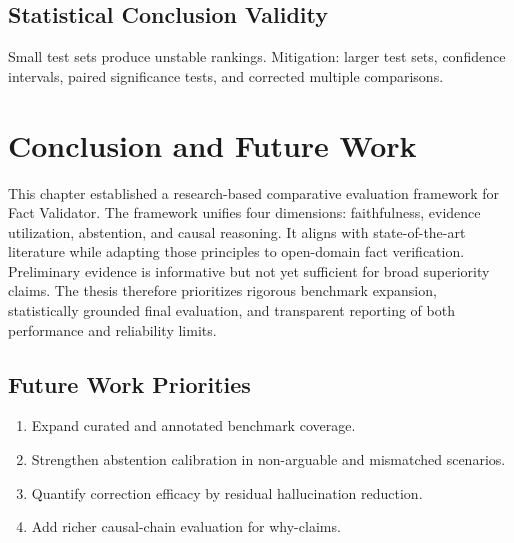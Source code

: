 \documentclass[12pt,a4paper,oneside]{report}
\begin{document}
\section{Statistical Conclusion Validity}
Small test sets produce unstable rankings.
Mitigation: larger test sets, confidence intervals, paired significance tests, and corrected multiple comparisons.

\chapter{Conclusion and Future Work}
\label{chap:conclusion}

This chapter established a research-based comparative evaluation framework for Fact Validator.
The framework unifies four dimensions: faithfulness, evidence utilization, abstention, and causal reasoning.
It aligns with state-of-the-art literature while adapting those principles to open-domain fact verification.
Preliminary evidence is informative but not yet sufficient for broad superiority claims.
The thesis therefore prioritizes rigorous benchmark expansion, statistically grounded final evaluation, and transparent reporting of both performance and reliability limits.

\section*{Future Work Priorities}
\begin{enumerate}
  \item Expand curated and annotated benchmark coverage.
  \item Strengthen abstention calibration in non-arguable and mismatched scenarios.
  \item Quantify correction efficacy by residual hallucination reduction.
  \item Add richer causal-chain evaluation for why-claims.
\end{enumerate}
\end{document}
